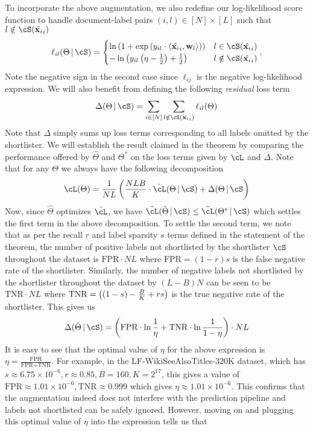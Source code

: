 To incorporate the above augmentation, we also redefine our log-likelihood score function to handle document-label pairs $(i,l) \in [N] \times [L]$ such that $l \notin \cS(\hat\vx_i)$
\[
\ell_{il}(\Theta \cond \cS) = \begin{cases}
\ln\br{1 + \exp\br{y_{il}\cdot\ip{\hat\vx_i}{\vw_l}}} & l \in \cS(\hat\vx_i)\\
-\ln\br{y_{il}\br{\eta - \frac12} + \frac12} & l \notin \cS(\hat\vx_i)
\end{cases},
\]
Note the negative sign in the second case since $\ell_{ij}$ is the negative log-likelihood expression. We will also benefit from defining the following \emph{residual} loss term
\[
\Delta(\Theta \cond \cS) = \sum_{i \in [N]}\sum_{l \notin \cS(\hat\vx_i)}\ell_{il}(\Theta)
\]
Note that $\Delta$ simply sums up loss terms corresponding to all labels omitted by the shortlister. We will establish the result claimed in the theorem by comparing the performance offered by $\hat\Theta$ and $\Theta^\ast$ on the loss terms given by $\tilde\cL$ and $\Delta$. Note that for any $\Theta$ we always have the following decomposition
\[
\cL(\Theta) = \frac1{NL}\br{\frac{NLB}K\cdot\tilde\cL(\Theta \cond \cS) + \Delta(\Theta \cond \cS}
\]
\newcommand{\fnr}{\text{FPR}}
\newcommand{\tnr}{\text{TNR}}
Now, since $\hat\Theta$ optimizes $\tilde\cL$, we have $\tilde\cL(\hat\Theta \cond \cS) \leq \tilde\cL(\Theta^\ast \cond \cS)$ which settles the first term in the above decomposition. To settle the second term, we note that as per the recall $r$ and label sparsity $s$ terms defined in the statement of the theorem, the number of positive labels not shortlisted by the shortlister $\cS$ throughout the dataset is $\fnr\cdot NL$ where $\fnr = (1-r)s$ is the false negative rate of the shortlister. Similarly, the number of negative labels not shortlisted by the shortlister throughout the dataset by $(L-B)N$ can be seen to be $\tnr\cdot NL$ where $\tnr = \br{(1-s) - \frac BK + rs}$ is the true negative rate of the shortlister. This gives us
\[
\Delta(\hat\Theta \cond \cS) = \br{\fnr\cdot\ln\frac1\eta + \tnr\cdot\ln\frac1{1-\eta}}\cdot NL
\]
It is easy to see that the optimal value of $\eta$ for the above expression is $\eta = \frac{\fnr}{\fnr + \tnr}$. For example, in the LF-WikiSeeAlsoTitles-320K dataset, which has $s \approx 6.75 \times 10^{-6}, r \approx 0.85, B = 160, K = 2^{17}$, this gives a value of $\fnr \approx 1.01 \times 10^{-6}, \tnr \approx 0.999$ which gives $\eta \approx 1.01 \times 10^{-6}$. This confirms that the augmentation indeed does not interfere with the prediction pipeline and labels not shortlisted can be safely ignored. However, moving on and plugging this optimal value of $\eta$ into the expression tells us that
